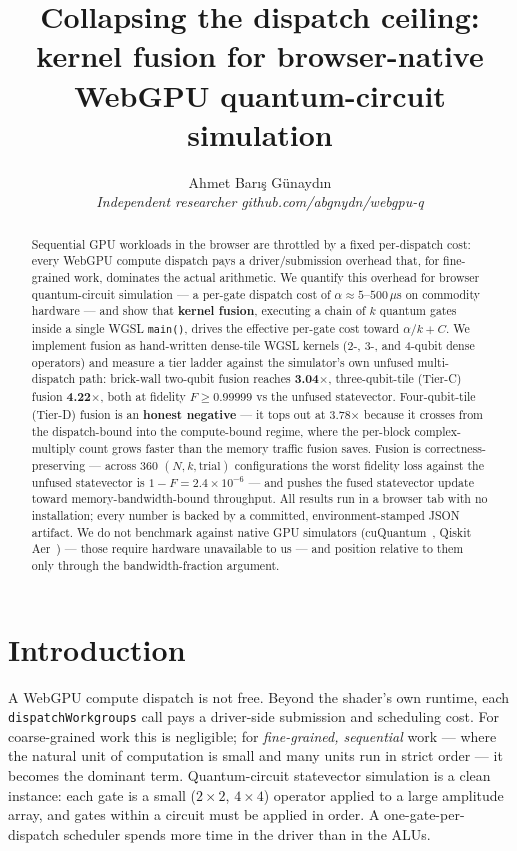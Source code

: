 \documentclass[11pt]{article}
\title{Collapsing the dispatch ceiling: kernel fusion for browser-native
WebGPU quantum-circuit simulation}
\author{Ahmet Bar\i{}\c{s} G\"unayd\i{}n\\
\small\textit{Independent researcher\,\textperiodcentered\,github.com/abgnydn/webgpu-q}}
\date{}
\begin{document}
\maketitle

\begin{abstract}
Sequential GPU workloads in the browser are throttled by a fixed per-dispatch
cost: every WebGPU compute dispatch pays a driver/submission overhead that, for
fine-grained work, dominates the actual arithmetic. We quantify this overhead
for browser quantum-circuit simulation --- a per-gate dispatch cost of
$\alpha \approx 5$--$500\,\mu$s on commodity hardware --- and show that
\textbf{kernel fusion}, executing a chain of $k$ quantum gates inside a single
WGSL \texttt{main()}, drives the effective per-gate cost toward $\alpha/k + C$.
We implement fusion as hand-written dense-tile WGSL kernels (2-, 3-, and
4-qubit dense operators) and measure a tier ladder against the simulator's own
unfused multi-dispatch path: brick-wall two-qubit fusion reaches
\textbf{3.04$\times$}, three-qubit-tile (Tier-C) fusion \textbf{4.22$\times$},
both at fidelity $F \ge 0.99999$ vs the unfused statevector. Four-qubit-tile
(Tier-D) fusion is an \textbf{honest negative} --- it tops out at 3.78$\times$
because it crosses from the dispatch-bound into the compute-bound regime, where
the per-block complex-multiply count grows faster than the memory traffic
fusion saves. Fusion is correctness-preserving --- across 360 $(N,k,\text{trial})$
configurations the worst fidelity loss against the unfused statevector is
$1-F = 2.4\times10^{-6}$ --- and pushes the fused statevector update toward
memory-bandwidth-bound throughput. All results run in a browser tab with no
installation; every number is backed by a committed, environment-stamped JSON
artifact. We do not benchmark against native GPU simulators
(cuQuantum~\cite{cuquantum}, Qiskit Aer~\cite{qiskit}) --- those require
hardware unavailable to us --- and position relative to them only through the
bandwidth-fraction argument.
\end{abstract}

\section{Introduction}

A WebGPU compute dispatch is not free. Beyond the shader's own runtime, each
\texttt{dispatchWorkgroups} call pays a driver-side submission and scheduling
cost. For coarse-grained work this is negligible; for \emph{fine-grained,
sequential} work --- where the natural unit of computation is small and many
units run in strict order --- it becomes the dominant term. Quantum-circuit
statevector simulation is a clean instance: each gate is a small ($2\times2$,
$4\times4$) operator applied to a large amplitude array, and gates within a
circuit must be applied in order. A one-gate-per-dispatch scheduler spends more
time in the driver than in the ALUs.
\end{document}
